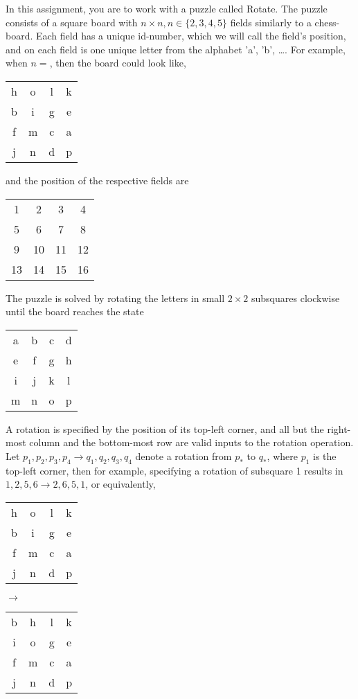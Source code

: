 In this assignment, you are to work with a puzzle called Rotate. The puzzle consists of a square board with $n\times n, n \in \{2, 3, 4, 5\}$ fields similarly to a chess-board. Each field has a unique id-number, which we will call the field's position, and on each field is one unique letter from the alphabet 'a', 'b', \dots. For example, when $n=$, then the board could look like,
\begin{center}
  \begin{tabular}{cccc}
     h &o &l &k
     \\b &i &g &e
     \\f &m &c &a
     \\j &n &d &p
  \end{tabular}
\end{center}
and the position of the respective fields are
\begin{center}
  \begin{tabular}{cccc}
    1  &2  &3  &4
    \\ 5  &6  &7  &8
    \\ 9 &10 &11 &12
    \\13 &14 &15 &16
  \end{tabular}
\end{center}
The puzzle is solved by rotating the letters in small $2\times 2$ subsquares clockwise until the board reaches the state
\begin{center}
  \begin{tabular}{cccc}
    a &b &c &d
    \\ e &f &g &h
    \\ i &j &k &l
    \\ m &n &o &p
  \end{tabular}
\end{center}
A rotation is specified by the position of its top-left corner, and all but the right-most column and the bottom-most row are valid inputs to the rotation operation. Let $p_1, p_2, p_3, p_4 \rightarrow q_1, q_2, q_3, q_4$ denote a rotation from $p_*$ to $q_*$, where $p_1$ is the top-left corner, then for example, specifying a rotation of subsquare 1 results in $1, 2, 5, 6\rightarrow 2, 6, 5, 1$, or equivalently,
\begin{center}
  \begin{tabular}{cccc}
     h &o &l &k
     \\b &i &g &e
     \\f &m &c &a
     \\j &n &d &p
  \end{tabular}
  $\rightarrow$
  \begin{tabular}{cccc}
     b &h &l &k
     \\i &o &g &e
     \\f &m &c &a
     \\j &n &d &p
  \end{tabular}
\end{center}
